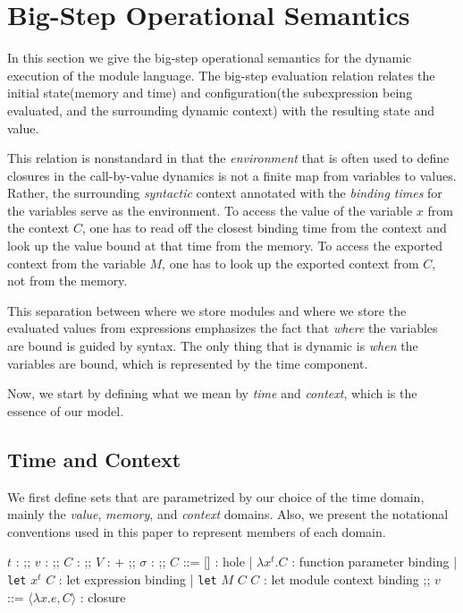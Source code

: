 \documentclass{article}
\theoremstyle{definition}
\newcommand*{\Time}{\mathbb{T}}
\newcommand*{\Ctx}[1]{\text{Ctx}\:{#1}}
\newcommand*{\Value}[1]{\text{Val}\:{#1}}
\newcommand*{\Mem}[1]{\text{Mem}\:{#1}}
\newcommand*{\fin}[2]{{#1}\xrightarrow{\text{fin}}{#2}}
\begin{document}
\section{Big-Step Operational Semantics}

In this section we give the big-step operational semantics for the dynamic execution of the module language.
The big-step evaluation relation relates the initial state(memory and time) and configuration(the subexpression being evaluated, and the surrounding dynamic context) with the resulting state and value.

This relation is nonstandard in that the \emph{environment} that is often used to define closures in the call-by-value dynamics is not a finite map from variables to values.
Rather, the surrounding \emph{syntactic} context annotated with the \emph{binding times} for the variables serve as the environment.
To access the value of the variable $x$ from the context $C$, one has to read off the closest binding time from the context and look up the value bound at that time from the memory.
To access the exported context from the variable $M$, one has to look up the exported context from $C$, not from the memory.

This separation between where we store modules and where we store the evaluated values from expressions emphasizes the fact that \emph{where} the variables are bound is guided by syntax.
The only thing that is dynamic is \emph{when} the variables are bound, which is represented by the time component.

Now, we start by defining what we mean by \emph{time} and \emph{context}, which is the essence of our model.

\subsection{Time and Context}

We first define sets that are parametrized by our choice of the time domain, mainly the \emph{value}, \emph{memory}, and \emph{context} domains.
Also, we present the notational conventions used in this paper to represent members of each domain.

\begin{bnfgrammar}
  $t$ : \in \Time
  ;;
  $v$ : \in \Value{\Time}
  ;;
  $C$ : \in \Ctx{\Time}
  ;;
  $V$ : \in \Value{\Time}+\Ctx{\Time}
  ;;
  $\sigma$ : \in \Mem{\Time} \triangleq \fin{\Time}{\Value{\Time}}
  ;;
  $C$ ::= [] : hole
  | $\lambda x^{t}.C$ : function parameter binding
  | \texttt{let} $x^{t}$ $C$ : let expression binding
  | \texttt{let} $M$ $C$ $C$ : let module context binding
  ;;
  $v$ ::= $\langle \lambda x.e, C \rangle$ : closure
\end{bnfgrammar}
\end{document}
